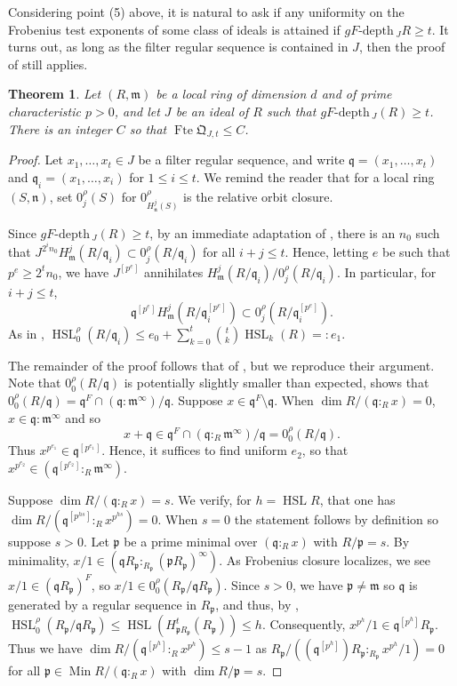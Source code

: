 \documentclass{amsproc}
\newtheorem{theorem}{Theorem}[section]
\theoremstyle{definition}
\theoremstyle{remark}
\numberwithin{equation}{section}
\newcommand{\fm}{\mathfrak{m}}
\newcommand{\fp}{\mathfrak{p}}
\newcommand{\fq}{\mathfrak{q}}
\newcommand{\Min}{\operatorname{Min}}
\newcommand{\fbp}[1]{\left[ #1 \right]}
\newcommand{\fte}{\operatorname{Fte}}
\newcommand{\gfdp}{gF\text{-depth}\,}
\newcommand{\HSL}{\operatorname{HSL}}
\newcommand{\fQ}{\mathfrak{Q}}
\begin{document}
Considering point (5) above, it is natural to ask if any uniformity on the Frobenius test exponents of some class of ideals is attained if $\gfdp_J R \ge t$. It turns out, as long as the filter regular sequence is contained in $J$, then the proof of \cite[Thm. 3.6]{HQ22} still applies.

\begin{theorem}\label{thm: gfdp_J and filter regular seqeunces}
Let $(R,\fm)$ be a local ring of dimension $d$ and of prime characteristic $p>0$, and let $J$ be an ideal of $R$ such that $\gfdp_J(R) \ge t$. There is an integer $C$ so that $\fte \fQ_{J,t}\le C$.    
\end{theorem}

\begin{proof}
Let $x_1,\ldots,x_t \in J$ be a filter regular sequence, and write $\fq = (x_1,\ldots,x_t)$ and $\fq_i = (x_1,\ldots,x_i)$ for $1 \le i \le t$. We remind the reader that for a local ring $(S,\mathfrak{n})$, set $0^\rho_j(S)$ for $0^\rho_{H^j_{\mathfrak{n}}(S)}$ is the relative orbit closure. 

Since $\gfdp_J(R) \ge t$, by an immediate adaptation of \cite[Lem. 3.5]{Mad19}, there is an $n_0$ such that $J^{2^in_0}H^j_\fm(R/\fq_i) \subset 0^\rho_j(R/\fq_i)$ for all $i+j\le t$. Hence, letting $e$ be such that $p^e \ge 2^tn_0$, we have $J^{\fbp{p^e}}$ annihilates $H^j_\fm(R/\fq_i)/0^\rho_j(R/\fq_i)$. In particular, for $i +j \le t$, \[\fq^{\fbp{p^e}} H^j_\fm\left(R/\fq_i^{\fbp{p^e}}\right)\subset 0^\rho_j\left(R/\fq_i^{\fbp{p^e}}\right).\] As in \cite[Prop. 3.3]{HQ22}, $\HSL_0^\rho(R/\fq_i) \le e_0 +  \sum_{k=0}^t \binom{t}{k} \HSL_k(R) =: e_1$.

The remainder of the proof follows that of \cite[Thm. 3.6]{HQ22}, but we reproduce their argument. Note that $0^\rho_0(R/\fq)$ is potentially slightly smaller than expected, \cite[Lem. 2.9]{HQ22} shows that $0^\rho_0(R/\fq) = \fq^F\cap (\fq:\fm^{\infty})/\fq$. Suppose $x \in \fq^F \setminus \fq$. When $\dim R/(\fq:_Rx) = 0$, $x \in \fq:\fm^{\infty}$ and so $$x+\fq \in \fq^F\cap (\fq:_R\fm^{\infty})/\fq = 0^\rho_0(R/\fq).$$ Thus $x^{p^{e_1}} \in \fq^{\fbp{p^{e_1}}}$. Hence, it suffices to find uniform $e_2$, so that $x^{p^{e_2}} \in \left(\fq^{\fbp{p^{e_2}}}:_R\fm^{\infty}\right)$. 


Suppose $\dim R/(\fq:_R x) = s$. We verify, for $h=\HSL R$, that one has $\dim R/\left( \fq^{\fbp{p^{hs}}}:_R x^{p^{hs}}\right) = 0$. When $s=0$ the statement follows by definition so suppose $s>0$. Let $\fp$ be a prime minimal over $(\fq:_Rx)$ with $R/\fp=s$. By minimality, $x/1 \in (\fq R_\fp:_{R_\fp}(\fp R_\fp)^\infty)$. As Frobenius closure localizes, we see $x/1 \in (\fq R_\fp)^F$, so $x/1 \in 0^\rho_0(R_\fp/\fq R_\fp)$. Since $s>0$, we have $\fp \neq \fm$ so $\fq$ is generated by a regular sequence in $R_\fp$, and thus, by \cite[Rmk. 3.4 and Lem. 3.5]{HQ22}, $\HSL^\rho_0(R_\fp/\fq R_\fp) \le \HSL(H^t_{\fp R_\fp}(R_\fp)) \le h$. Consequently, $x^{p^h}/1 \in \fq^{\fbp{p^h}}R_\fp$. Thus we have $\dim R/\left(\fq^{\fbp{p^h}}:_R x^{p^h}\right) \le s-1$ as $R_\fp / \left(\left(\fq^{\fbp{p^h}}\right) R_\fp :_{R_\fp} x^{p^h}/1\right) = 0$ for all $\fp \in \Min R/(\fq:_Rx)$ with $\dim R/\fp = s$. 


\end{proof}
\end{document}
